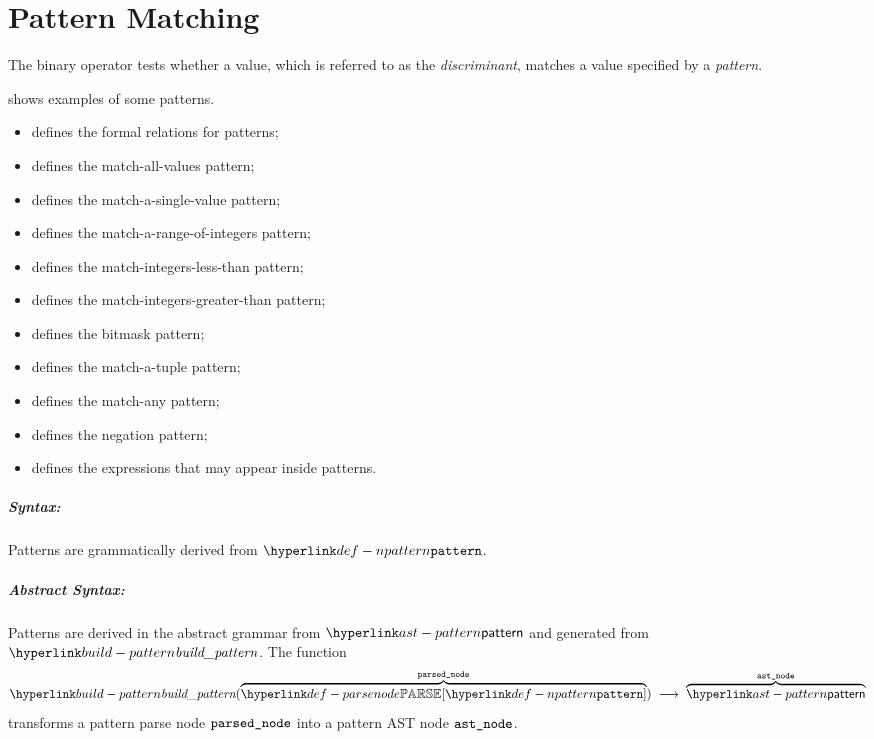 \chapter{Pattern Matching\label{chap:PatternMatching}}

The binary operator \Tin{} tests whether a value, which is referred to as the \emph{discriminant},
matches a value specified by a \emph{pattern}.

 shows examples of some patterns.

\ChapterOutline
\begin{itemize}
  \item {} defines the formal relations for patterns;
  \item {} defines the match-all-values pattern;
  \item {} defines the match-a-single-value pattern;
  \item {} defines the match-a-range-of-integers pattern;
  \item {} defines the match-integers-less-than pattern;
  \item {} defines the match-integers-greater-than pattern;
  \item {} defines the bitmask pattern;
  \item {} defines the match-a-tuple pattern;
  \item {} defines the match-any pattern;
  \item {} defines the negation pattern;
  \item {} defines the expressions that may appear inside patterns.
\end{itemize}

\paragraph{Syntax:} Patterns are grammatically derived from $\Npattern$.

\paragraph{Abstract Syntax:} Patterns are derived in the abstract grammar from $\pattern$
  and generated from $\buildpattern$.
  \hypertarget{build-pattern}{}
  The function
\[
  \buildpattern(\overname{\parsenode{\Npattern}}{\vparsednode}) \;\aslto\;
  \overname{\pattern}{\vastnode}
\]
transforms a pattern parse node $\texttt{parsed\_node}$ into a pattern AST node $\texttt{ast\_node}$.

